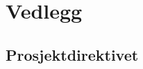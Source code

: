 \documentclass[11pt]{report} %
\begin{document}
                \listoffigures

                \appendix
                  \part*{Vedlegg}
                  \chapter{Prosjektdirektivet}\label{orig_pro_beskr}

                    

              
\end{document}
